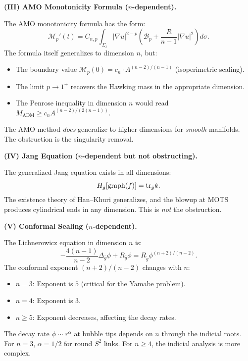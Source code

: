 \begin{remark}
\textbf{(III) AMO Monotonicity Formula ($n$-dependent).}

The AMO monotonicity formula has the form:
\begin{equation}
    \mathcal{M}_p'(t) = C_{n,p} \int_{\Sigma_t} |\nabla u|^{2-p} \left( \mathcal{B}_p + \frac{R}{n-1} |\nabla u|^2 \right) d\sigma.
\end{equation}
The formula itself generalizes to dimension $n$, but:
\begin{itemize}
    \item The boundary value $\mathcal{M}_p(0) = c_n \cdot A^{(n-2)/(n-1)}$ (isoperimetric scaling).
    \item The limit $p \to 1^+$ recovers the Hawking mass in the appropriate dimension.
    \item The Penrose inequality in dimension $n$ would read $M_{\mathrm{ADM}} \ge c_n A^{(n-2)/(2(n-1))}$.
\end{itemize}
The AMO method \emph{does} generalize to higher dimensions for \emph{smooth} manifolds. The obstruction is the singularity removal.

\textbf{(IV) Jang Equation ($n$-dependent but not obstructing).}

The generalized Jang equation exists in all dimensions:
\begin{equation}
    H_{\bar{g}}[\mathrm{graph}(f)] = \mathrm{tr}_{\bar{g}} k.
\end{equation}
The existence theory of Han--Khuri generalizes, and the blowup at MOTS produces cylindrical ends in any dimension. This is \emph{not} the obstruction.

\textbf{(V) Conformal Sealing ($n$-dependent).}

The Lichnerowicz equation in dimension $n$ is:
\begin{equation}
    -\frac{4(n-1)}{n-2} \Delta_{\bar{g}} \phi + R_{\bar{g}} \phi = R_{\tilde{g}} \phi^{(n+2)/(n-2)}.
\end{equation}
The conformal exponent $(n+2)/(n-2)$ changes with $n$:
\begin{itemize}
    \item $n = 3$: Exponent is $5$ (critical for the Yamabe problem).
    \item $n = 4$: Exponent is $3$.
    \item $n \ge 5$: Exponent decreases, affecting the decay rates.
\end{itemize}
The decay rate $\phi \sim r^\alpha$ at bubble tips depends on $n$ through the indicial roots. For $n = 3$, $\alpha = 1/2$ for round $S^2$ links. For $n \ge 4$, the indicial analysis is more complex.


\end{remark}
